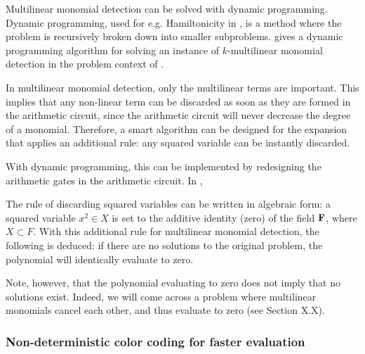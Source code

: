 Multilinear monomial detection can be solved with dynamic programming. 
Dynamic programming, used for e.g. Hamiltonicity in \cite{HelKar62}, is a method where the problem 
is recursively broken down into smaller subproblems. \cite{Fomin17} gives a dynamic programming algorithm 
for solving an instance of $k$-multilinear monomial detection in the problem context of 
.

In multilinear monomial detection, only the multilinear terms are important. This implies that any non-linear term can be discarded 
as soon as they are formed in the arithmetic circuit, since the arithmetic circuit will never decrease the degree of a monomial. 
Therefore, a smart algorithm can be designed for the expansion that applies an additional rule: 
any squared variable can be instantly discarded.

With dynamic programming, this can be implemented by redesigning the arithmetic gates in the arithmetic circuit. 
In ,

The rule of discarding squared variables can be written in algebraic form: 
a squared variable $x^2 \in X$ is set to the additive identity (zero) of the field $\textbf F$, 
where $X \subset F$. 
With this additional rule for multilinear monomial detection, the following is deduced: 
if there are no solutions to the original problem, 
the polynomial will identically evaluate to zero.

Note, however, that the polynomial evaluating to zero does not
imply that no
solutions exist. 
Indeed, we will come across a problem where multilinear monomials cancel each other, 
and thus evaluate to zero (see Section X.X).

\subsubsection{Non-deterministic color coding for faster evaluation}

